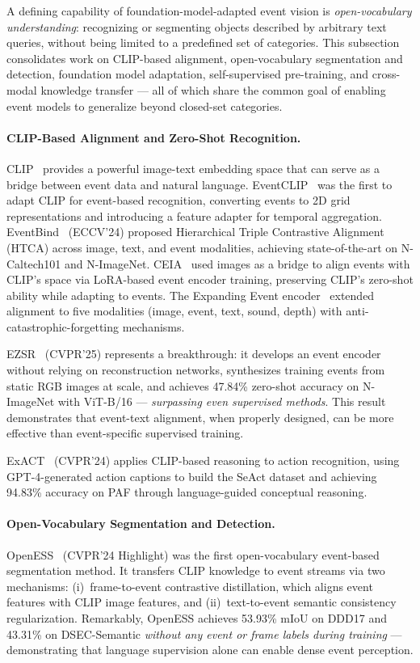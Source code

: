 A defining capability of foundation-model-adapted event vision is \textit{open-vocabulary understanding}: recognizing or segmenting objects described by arbitrary text queries, without being limited to a predefined set of categories. This subsection consolidates work on CLIP-based alignment, open-vocabulary segmentation and detection, foundation model adaptation, self-supervised pre-training, and cross-modal knowledge transfer --- all of which share the common goal of enabling event models to generalize beyond closed-set categories.

\paragraph{CLIP-Based Alignment and Zero-Shot Recognition.}
CLIP~\cite{radford2021clip} provides a powerful image-text embedding space that can serve as a bridge between event data and natural language. EventCLIP~\cite{wu2023eventclip} was the first to adapt CLIP for event-based recognition, converting events to 2D grid representations and introducing a feature adapter for temporal aggregation. EventBind~\cite{zhou2024eventbind} (ECCV'24) proposed Hierarchical Triple Contrastive Alignment (HTCA) across image, text, and event modalities, achieving state-of-the-art on N-Caltech101 and N-ImageNet. CEIA~\cite{wei2024ceia} used images as a bridge to align events with CLIP's space via LoRA-based event encoder training, preserving CLIP's zero-shot ability while adapting to events. The Expanding Event encoder~\cite{zhou2024expanding} extended alignment to five modalities (image, event, text, sound, depth) with anti-catastrophic-forgetting mechanisms.

EZSR~\cite{cho2025ezsr} (CVPR'25) represents a breakthrough: it develops an event encoder without relying on reconstruction networks, synthesizes training events from static RGB images at scale, and achieves 47.84\% zero-shot accuracy on N-ImageNet with ViT-B/16 --- \textit{surpassing even supervised methods}. This result demonstrates that event-text alignment, when properly designed, can be more effective than event-specific supervised training.

ExACT~\cite{tang2024exact} (CVPR'24) applies CLIP-based reasoning to action recognition, using GPT-4-generated action captions to build the SeAct dataset and achieving 94.83\% accuracy on PAF through language-guided conceptual reasoning.

\paragraph{Open-Vocabulary Segmentation and Detection.}
OpenESS~\cite{kong2024openess} (CVPR'24 Highlight) was the first open-vocabulary event-based segmentation method. It transfers CLIP knowledge to event streams via two mechanisms: (i)~frame-to-event contrastive distillation, which aligns event features with CLIP image features, and (ii)~text-to-event semantic consistency regularization. Remarkably, OpenESS achieves 53.93\% mIoU on DDD17 and 43.31\% on DSEC-Semantic \textit{without any event or frame labels during training} --- demonstrating that language supervision alone can enable dense event perception.

